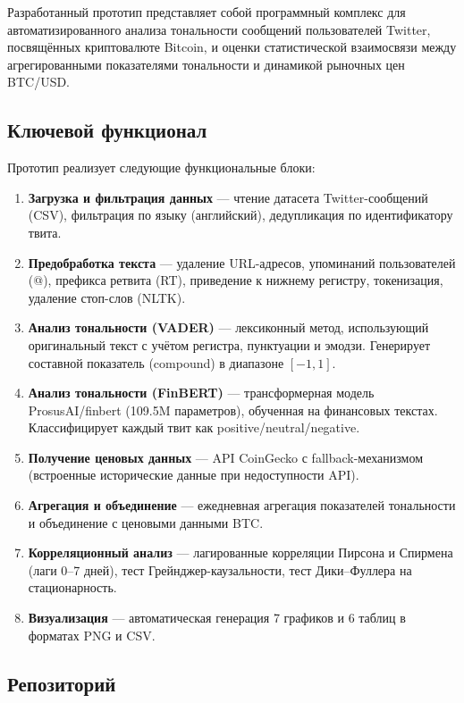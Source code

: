 \documentclass[a4paper,12pt]{article}
\begin{document}
Разработанный прототип представляет собой программный комплекс для автоматизированного
анализа тональности сообщений пользователей Twitter, посвящённых криптовалюте Bitcoin,
и оценки статистической взаимосвязи между агрегированными показателями тональности
и динамикой рыночных цен BTC/USD.

\subsection{Ключевой функционал}

Прототип реализует следующие функциональные блоки:

\begin{enumerate}[label=\arabic*.]
  \item \textbf{Загрузка и фильтрация данных} --- чтение датасета Twitter-сообщений (CSV),
        фильтрация по языку (английский), дедупликация по идентификатору твита.
  \item \textbf{Предобработка текста} --- удаление URL-адресов, упоминаний пользователей (@),
        префикса ретвита (RT), приведение к нижнему регистру, токенизация,
        удаление стоп-слов (NLTK).
  \item \textbf{Анализ тональности (VADER)} --- лексиконный метод, использующий
        оригинальный текст с учётом регистра, пунктуации и эмодзи. Генерирует
        составной показатель (compound) в диапазоне $[-1, 1]$.
  \item \textbf{Анализ тональности (FinBERT)} --- трансформерная модель
        ProsusAI/finbert (109.5M параметров), обученная на финансовых текстах.
        Классифицирует каждый твит как positive/neutral/negative.
  \item \textbf{Получение ценовых данных} --- API CoinGecko с fallback-механизмом
        (встроенные исторические данные при недоступности API).
  \item \textbf{Агрегация и объединение} --- ежедневная агрегация показателей тональности
        и объединение с ценовыми данными BTC.
  \item \textbf{Корреляционный анализ} --- лагированные корреляции Пирсона и Спирмена
        (лаги 0--7 дней), тест Грейнджер-каузальности, тест Дики--Фуллера на стационарность.
  \item \textbf{Визуализация} --- автоматическая генерация 7 графиков и 6 таблиц
        в форматах PNG и CSV.
\end{enumerate}

\subsection{Репозиторий}
\end{document}
